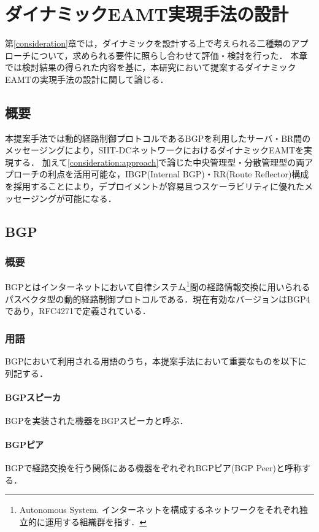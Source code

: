 \chapter{ダイナミックEAMT実現手法の設計}
\label{proposal}
第\ref{consideration}章では，ダイナミックを設計する上で考えられる二種類のアプローチについて，求められる要件に照らし合わせて評価・検討を行った．
本章では検討結果の得られた内容を基に，本研究において提案するダイナミックEAMTの実現手法の設計に関して論じる．

\section{概要}
本提案手法では動的経路制御プロトコルであるBGPを利用したサーバ・BR間のメッセージングにより，SIIT-DCネットワークにおけるダイナミックEAMTを実現する．
加えて\ref{consideration:approach}で論じた中央管理型・分散管理型の両アプローチの利点を活用可能な，IBGP(Internal BGP)・RR(Route Reflector)構成を採用することにより，デプロイメントが容易且つスケーラビリティに優れたメッセージングが可能になる．

\section{BGP}
\subsection{概要}
BGPとはインターネットにおいて自律システム\footnote{Autonomous System. インターネットを構成するネットワークをそれぞれ独立的に運用する組織群を指す．}間の経路情報交換に用いられるパスベクタ型の動的経路制御プロトコルである．現在有効なバージョンはBGP4であり，RFC4271で定義されている\cite{RFC4271}．


\subsection{用語}
BGPにおいて利用される用語のうち，本提案手法において重要なものを以下に列記する．

\subsubsection{BGPスピーカ}
BGPを実装された機器をBGPスピーカと呼ぶ．

\subsubsection{BGPピア}
BGPで経路交換を行う関係にある機器をぞれぞれBGPピア(BGP Peer)と呼称する．

